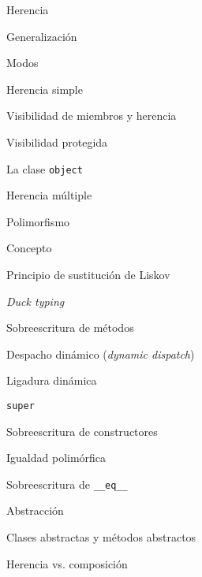 \begin{longenum}
\begin{longenum}
        \item Herencia
        \begin{longenum}
            \item Generalización
            \item Modos
            \begin{longenum}
                \item Herencia simple
                \item Visibilidad de miembros y herencia
                \begin{longenum}
                    \item Visibilidad protegida
                \end{longenum}
                \item La clase \texttt{object}
                \item Herencia múltiple
            \end{longenum}
        \end{longenum}
        \item Polimorfismo
        \begin{longenum}
            \item Concepto
            \item Principio de sustitución de Liskov
            \item \textit{Duck typing}
            \item Sobreescritura de métodos
            \begin{longenum}
                \item Despacho dinámico (\textit{dynamic dispatch})
            \end{longenum}
            \item Ligadura dinámica
            \item \texttt{super}
            \item Sobreescritura de constructores
            \item Igualdad polimórfica
            \item Sobreescritura de \texttt{\_\_eq\_\_}
        \end{longenum}
        \item Abstracción
        \begin{longenum}
            \item Clases abstractas y métodos abstractos
        \end{longenum}
        \item Herencia vs. composición
    \end{longenum}

\end{longenum}
